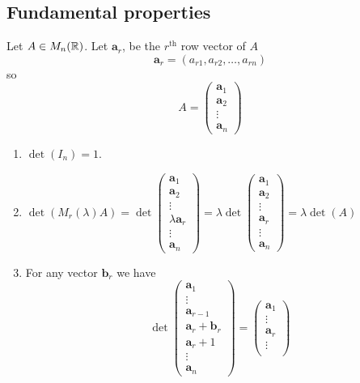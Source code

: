 \documentclass[10pt, a4paper]{article}
\newcommand{\mbf}[1]{\mathbf{#1}}
\begin{document}
\subsection{Fundamental properties}
Let $A \in M_n(\mathbb{R})$.
Let $\mbf{a}_{r}$,
be the $r ^ {\text{th}}$ row vector of $A$
\[
\mbf{a}_r = (a_{r1}, a_{r2}, \dotsc, a_{rn})
\]
so
\[
A = \begin{pmatrix}
    \mbf{a}_1 \\
    \mbf{a}_2 \\
    \vdots \\
    \mbf{a}_n
\end{pmatrix}
\]
\begin{enumerate}[label = (\roman*)]
    \item $\det(I_n) = 1$.
    \item $\det(M_r(\lambda)A) = \det\begin{pmatrix}
    \mbf{a}_1 \\
    \mbf{a}_2 \\
    \vdots \\
    \lambda \mbf{a}_r \\
    \vdots \\
    \mbf{a}_n
\end{pmatrix} = \lambda \det\begin{pmatrix}
    \mbf{a}_1 \\
    \mbf{a}_2 \\
    \vdots \\
    \mbf{a}_r \\
    \vdots \\
    \mbf{a}_n
    \end{pmatrix} = \lambda\det(A)$
    \item For any vector $\mbf{b}_r$ we have
    \[
    \det\begin{pmatrix}
        \mbf{a}_1 \\
        \vdots \\
        \mbf{a}_{r - 1} \\
        \mbf{a}_r + \mbf{b}_r \\
        \mbf{a}_r + 1 \\
        \vdots \\
        \mbf{a}_n
    \end{pmatrix}
    =\begin{pmatrix}
    \mbf{a}_1 \\
    \vdots \\
    \mbf{a}_r \\
    \vdots \\

\end{pmatrix}\]
\end{enumerate}
\end{document}
